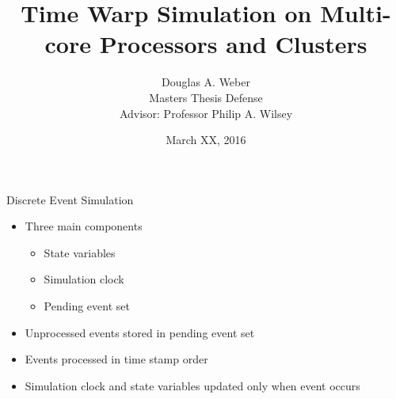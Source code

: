\documentclass[10pt]{beamer}
\title{Time Warp Simulation on Multi-core Processors and Clusters}
\author{
    Douglas A. Weber \\
    Masters Thesis Defense \\
    Advisor: Professor Philip A. Wilsey
}
\institute{University of Cincinnati}
\date{March XX, 2016}
\begin{document}
\begin{frame}
  \titlepage
\end{frame}

\begin{frame}{Discrete Event Simulation}
    \begin{itemize}
        \item Three main components
            \begin{itemize}
                \item State variables
                \item Simulation clock
                \item Pending event set
            \end{itemize}
        \bigskip
        \item Unprocessed events stored in pending event set
        \item Events processed in time stamp order
        \item Simulation clock and state variables updated only when event occurs
    \end{itemize}
\end{frame}
\end{document}
